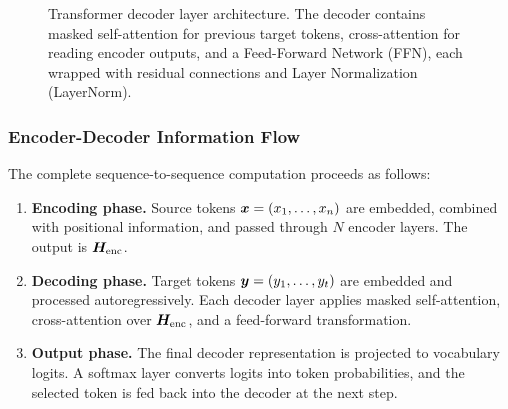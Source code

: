 \begin{figure}[htbp]
  \caption{Transformer decoder layer architecture. The decoder contains masked self-attention for previous target tokens, cross-attention for reading encoder outputs, and a Feed-Forward Network (FFN), each wrapped with residual connections and Layer Normalization (LayerNorm).}
  \label{fig:decoder}
\end{figure}

\subsubsection{Encoder-Decoder Information Flow}

The complete sequence-to-sequence computation proceeds as follows:
\begin{enumerate}[leftmargin=*]
  \item \textbf{Encoding phase.} Source tokens $\bm{x}=(x_1,\ldots,x_n)$ are embedded, combined with positional information, and passed through $N$ encoder layers. The output is $\bm{H}_{\text{enc}}$.
  \item \textbf{Decoding phase.} Target tokens $\bm{y}=(y_1,\ldots,y_t)$ are embedded and processed autoregressively. Each decoder layer applies masked self-attention, cross-attention over $\bm{H}_{\text{enc}}$, and a feed-forward transformation.
  \item \textbf{Output phase.} The final decoder representation is projected to vocabulary logits. A softmax layer converts logits into token probabilities, and the selected token is fed back into the decoder at the next step.
\end{enumerate}

